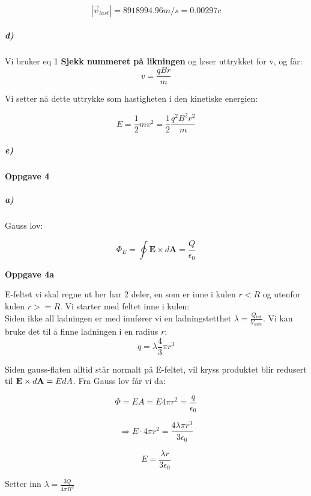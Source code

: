 \documentclass[a4paper,norsk, 10pt]{article}
\begin{document}
$$
|\vec{v}_{last}| = 8918994.96 m/s = 0.00297 c
$$

\subparagraph*{d)}

Vi bruker eq 1 \textbf{Sjekk nummeret på likningen} og løser uttrykket for v, og får:
\begin{equation}
v = \frac{qBr}{m} 
\end{equation}

Vi setter nå dette uttrykke som hastigheten i den kinetiske energien:

\begin{equation}
E = \frac{1}{2}mv^2 = \frac{1}{2} \frac{q^2B^2r^2}{m}
\end{equation}


\subparagraph*{e)}




\paragraph*{Oppgave 4}

\subparagraph*{a)}

Gauss lov:

$$ \Phi_E = \oint \textbf{E} \times d \textbf{A} = \dfrac{Q}{\epsilon_0}$$

\textbf{Oppgave 4a}


E-feltet vi skal regne ut her har 2 deler, en som er inne i kulen $r < R$ og utenfor kulen $r >= R$. Vi starter med feltet inne i kulen:\\

 
Siden ikke all ladningen er med innfører vi en ladningstetthet $\lambda = \frac{Q_{tot}}{V_{kule}}$. Vi kan bruke det til å finne ladningen i en radius $r$: 
$$ q = \lambda \dfrac{4}{3} \pi r^{3} $$

Siden gauss-flaten alltid står normalt på E-feltet, vil kryss produktet blir redusert til $\bold{E} \times d\bold{A} = EdA$. Fra Gauss lov får vi da:

$$ \Phi = EA = E 4 \pi r^2 = \dfrac{q}{\epsilon_0} $$

$$ \Rightarrow E\cdot 4 \pi r^2 =  \dfrac{4\lambda  \pi r^3}{3\epsilon_0} $$

$$ E = \frac{\lambda r}{3\epsilon_0} $$

Setter inn $\lambda = \frac{3Q}{4\pi R^3}$
\end{document}
